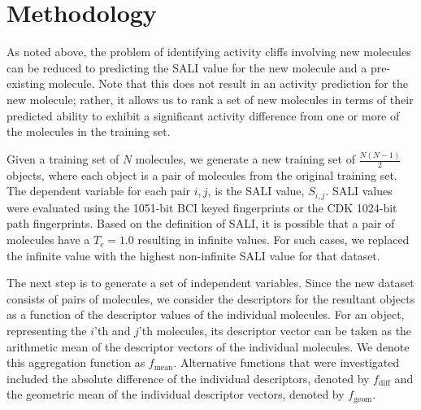 \documentclass[letterpaper, 12pt]{article}
\begin{document}

\section{Methodology}
\label{sec:methodology}
As noted above, the problem of identifying activity cliffs involving new molecules can be reduced to
predicting the SALI value for the new molecule and a pre-existing molecule. Note that this does not
result in an activity prediction for the new molecule; rather, it allows us to rank a set of new
molecules in terms of their predicted ability to exhibit a significant activity difference from one
or more of the molecules in the training set.

Given a training set of $N$ molecules, we generate a new training set
of $\frac{N(N-1)}{2}$ objects, where each object is a pair of
molecules from the original training set. The dependent variable for
each pair $i,j$, is the SALI value, $S_{i,j}$. SALI values were
evaluated using the 1051-bit BCI keyed fingerprints or the CDK
1024-bit path fingerprints. Based on the
definition of SALI, it is possible that a pair of molecules have a
$T_c = 1.0$ resulting in infinite values. For such cases, we replaced
the infinite value with the highest non-infinite SALI value for that
dataset. 

The next step is to generate a set of independent variables. Since the
new dataset consists of pairs of molecules, we consider the
descriptors for the resultant objects as a function of the descriptor
values of the individual molecules. For an object, representing the
$i$'th and $j$'th molecules, its descriptor vector can be taken as the
arithmetic mean of the descriptor vectors of the individual
molecules. We denote this aggregation function as
$f_{\textrm{mean}}$. Alternative functions that were investigated included
the absolute difference of the individual descriptors, denoted by
$f_{\textrm{diff}}$ and the geometric mean of the individual
descriptor vectors, denoted by $f_{\textrm{geom}}$. 
\end{document}
